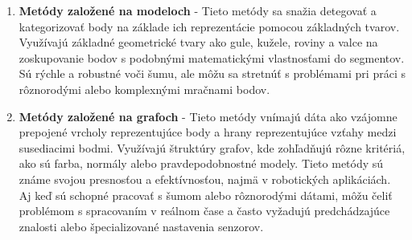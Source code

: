 \begin{enumerate}
 \item\textbf{Metódy založené na modeloch} - Tieto metódy sa snažia detegovať a kategorizovať body na základe ich reprezentácie pomocou základných tvarov. Využívajú základné geometrické tvary ako gule, kužele, roviny a valce na zoskupovanie bodov s podobnými matematickými vlastnosťami do segmentov. Sú rýchle a robustné voči šumu, ale môžu sa stretnúť s problémami pri práci s rôznorodými alebo komplexnými mračnami bodov. \cite{ransac}
 \item\textbf{Metódy založené na grafoch} - Tieto metódy vnímajú dáta ako vzájomne prepojené vrcholy reprezentujúce body a hrany reprezentujúce vzťahy medzi susediacimi bodmi. Využívajú štruktúry grafov, kde zohľadňujú rôzne kritériá, ako sú farba, normály alebo pravdepodobnostné modely. Tieto metódy sú známe svojou presnosťou a efektívnosťou, najmä v robotických aplikáciách. Aj keď sú schopné pracovať s šumom alebo rôznorodými dátami, môžu čeliť problémom s spracovaním v reálnom čase a často vyžadujú predchádzajúce znalosti alebo špecializované nastavenia senzorov.  \cite{segmetation_survey}\cite{graph_based}
\end{enumerate}

